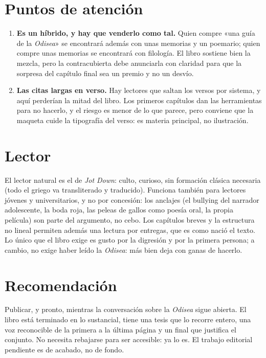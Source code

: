 \documentclass[12pt,a4paper]{article}
\begin{document}
\section*{Puntos de atención}

\begin{enumerate}
  \item \textbf{Es un híbrido, y hay que venderlo como tal.} Quien compre «una guía de la \emph{Odisea}» se encontrará además con unas memorias y un poemario; quien compre unas memorias se encontrará con filología. El libro sostiene bien la mezcla, pero la contracubierta debe anunciarla con claridad para que la sorpresa del capítulo final sea un premio y no un desvío.
  \item \textbf{Las citas largas en verso.} Hay lectores que saltan los versos por sistema, y aquí perderían la mitad del libro. Los primeros capítulos dan las herramientas para no hacerlo, y el riesgo es menor de lo que parece, pero conviene que la maqueta cuide la tipografía del verso: es materia principal, no ilustración.
\end{enumerate}

\section*{Lector}

El lector natural es el de \emph{Jot Down}: culto, curioso, sin formación clásica necesaria (todo el griego va transliterado y traducido). Funciona también para lectores jóvenes y universitarios, y no por concesión: los anclajes (el bullying del narrador adolescente, la boda roja, las peleas de gallos como poesía oral, la propia película) son parte del argumento, no cebo. Los capítulos breves y la estructura no lineal permiten además una lectura por entregas, que es como nació el texto. Lo único que el libro exige es gusto por la digresión y por la primera persona; a cambio, no exige haber leído la \emph{Odisea}: más bien deja con ganas de hacerlo.

\section*{Recomendación}

Publicar, y pronto, mientras la conversación sobre la \emph{Odisea} sigue abierta. El libro está terminado en lo sustancial, tiene una tesis que lo recorre entero, una voz reconocible de la primera a la última página y un final que justifica el conjunto. No necesita rebajarse para ser accesible: ya lo es. El trabajo editorial pendiente es de acabado, no de fondo.
\end{document}
